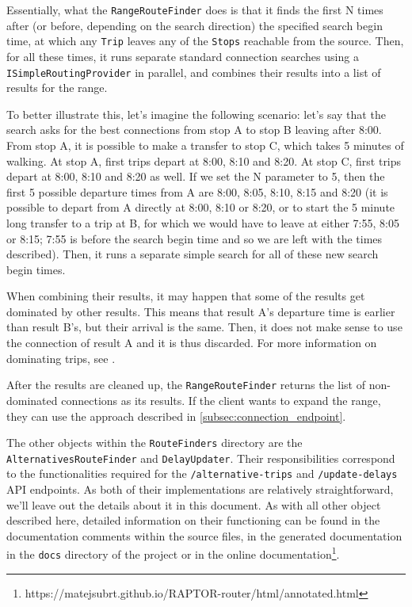 \begin{itemize}
    Essentially, what the \texttt{RangeRouteFinder} does is that it finds the first N times after (or before, depending on the search direction) the specified search begin time, at which any \texttt{Trip} leaves any of the \texttt{Stops} reachable from the source. Then, for all these times, it runs separate standard connection searches using a \texttt{ISimpleRoutingProvider} in parallel, and combines their results into a list of results for the range. 
    
    To better illustrate this, let's imagine the following scenario: let's say that the search asks for the best connections from stop A to stop B leaving after 8:00. From stop A, it is possible to make a transfer to stop C, which takes 5 minutes of walking. At stop A, first trips depart at 8:00, 8:10 and 8:20. At stop C, first trips depart at 8:00, 8:10 and 8:20 as well. If we set the N parameter to 5, then the first 5 possible departure times from A are 8:00, 8:05, 8:10, 8:15 and 8:20 (it is possible to depart from A directly at 8:00, 8:10 or 8:20, or to start the 5 minute long transfer to a trip at B, for which we would have to leave at either 7:55, 8:05 or 8:15; 7:55 is before the search begin time and so we are left with the times described). Then, it runs a separate simple search for all of these new search begin times. 
    
    When combining their results, it may happen that some of the results get dominated by other results. This means that result A's departure time is earlier than result B's, but their arrival is the same. Then, it does not make sense to use the connection of result A and it is thus discarded. For more information on dominating trips, see \textcite{delling2015raptor}.

    After the results are cleaned up, the \texttt{RangeRouteFinder} returns the list of non-dominated connections as its results. If the client wants to expand the range, they can use the approach described in \cref{subsec:connection_endpoint}.    
\end{itemize}

The other objects within the \texttt{RouteFinders} directory are the \texttt{AlternativesRouteFinder} and \texttt{DelayUpdater}. Their responsibilities correspond to the functionalities required for the \texttt{/alternative-trips} and \texttt{/update-delays} API endpoints. As both of their implementations are relatively straightforward, we'll leave out the details about it in this document. As with all other object described here, detailed information on their functioning can be found in the documentation comments within the source files, in the generated documentation in the \texttt{docs} directory of the project or in the online documentation\footnote{https://matejsubrt.github.io/RAPTOR-router/html/annotated.html}.

